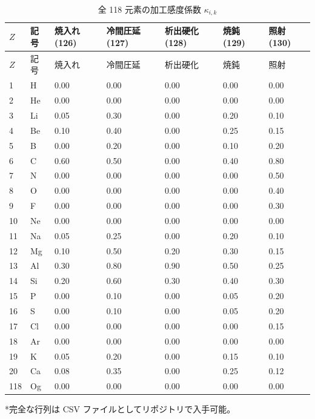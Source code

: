 \documentclass[11pt,a4paper]{article}
\theoremstyle{remark}
\begin{document}
	\begin{longtable}{p{2.2cm}p{1.2cm}p{2.2cm}p{2.2cm}p{2.2cm}p{2.2cm}p{2.2cm}}
		\caption{全 118 元素の加工感度係数 \(\kappa_{i,k}\)} \label{tab:kappa-ik-full} \\
		\toprule
		\(Z\) & 記号 & 焼入れ (126) & 冷間圧延 (127) & 析出硬化 (128) & 焼鈍 (129) & 照射 (130) \\
		\midrule
		\endfirsthead
		\toprule
		\(Z\) & 記号 & 焼入れ & 冷間圧延 & 析出硬化 & 焼鈍 & 照射 \\
		\midrule
		\endhead
		1  & H   & 0.00 & 0.00 & 0.00 & 0.00 & 0.00 \\
		2  & He  & 0.00 & 0.00 & 0.00 & 0.00 & 0.00 \\
		3  & Li  & 0.05 & 0.30 & 0.00 & 0.20 & 0.10 \\
		4  & Be  & 0.10 & 0.40 & 0.00 & 0.25 & 0.15 \\
		5  & B   & 0.00 & 0.20 & 0.00 & 0.10 & 0.20 \\
		6  & C   & 0.60 & 0.50 & 0.00 & 0.40 & 0.80 \\
		7  & N   & 0.00 & 0.00 & 0.00 & 0.00 & 0.50 \\
		8  & O   & 0.00 & 0.00 & 0.00 & 0.00 & 0.40 \\
		9  & F   & 0.00 & 0.00 & 0.00 & 0.00 & 0.30 \\
		10 & Ne  & 0.00 & 0.00 & 0.00 & 0.00 & 0.00 \\
		11 & Na  & 0.05 & 0.25 & 0.00 & 0.20 & 0.10 \\
		12 & Mg  & 0.10 & 0.50 & 0.20 & 0.30 & 0.15 \\
		13 & Al  & 0.30 & 0.80 & 0.90 & 0.50 & 0.25 \\
		14 & Si  & 0.20 & 0.60 & 0.30 & 0.40 & 0.30 \\
		15 & P   & 0.00 & 0.10 & 0.00 & 0.05 & 0.20 \\
		16 & S   & 0.00 & 0.10 & 0.00 & 0.05 & 0.20 \\
		17 & Cl  & 0.00 & 0.00 & 0.00 & 0.00 & 0.15 \\
		18 & Ar  & 0.00 & 0.00 & 0.00 & 0.00 & 0.00 \\
		19 & K   & 0.05 & 0.20 & 0.00 & 0.15 & 0.10 \\
		20 & Ca  & 0.08 & 0.35 & 0.00 & 0.25 & 0.12 \\
		118& Og  & 0.00 & 0.00 & 0.00 & 0.00 & 0.00 \\
		\bottomrule
	\end{longtable}
	*完全な行列は CSV ファイルとしてリポジトリで入手可能。
	
\end{document}
